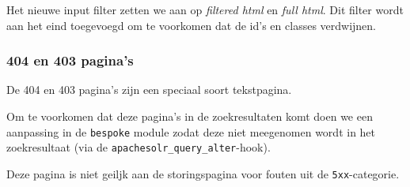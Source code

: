Het nieuwe input filter zetten we aan op \emph{filtered html} en \emph{full html}. Dit filter wordt aan het eind toegevoegd om te voorkomen dat de id's en classes verdwijnen.

\subsubsection{404 en 403 pagina's}\label{404pagina}

De 404 en 403 pagina's zijn een speciaal soort tekstpagina.

Om te voorkomen dat deze pagina's in de zoekresultaten komt doen we een aanpassing in de \texttt{bespoke} module zodat deze niet meegenomen wordt in het zoekresultaat (via de \texttt{apachesolr\_query\_alter}-hook).

Deze pagina is niet geiljk aan de storingspagina voor fouten uit de \texttt{5xx}-categorie.


